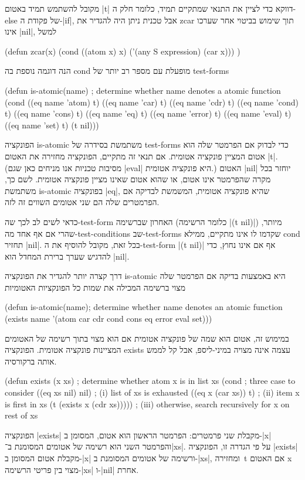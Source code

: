 מקובל להשתמש תמיד באטום \E|t| דווקא כדי לציין את התנאי שמתקיים תמיד, כלומר חלק
ה-else של פקודת ה-\E|if|, אבל טכנית ניתן היה להגדיר את zcar תוך שימוש בביטוי
אחר שערכו אינו \E|nil|, למשל
\begin{LISP}
(defun zcar(x)
  (cond ((atom x) x) ('(any S expression) (car x)))
)
\end{LISP}
הנה דוגמה נוספת בה cond מופעלת עם מספר רב יותר של test-forms
\begin{LISP}
(defun is-atomic(name) ; determine whether name denotes a atomic function
  (cond ((eq name 'atom) t)
        ((eq name 'car) t)
        ((eq name 'cdr) t)
        ((eq name 'cond) t)
        ((eq name 'cons) t)
        ((eq name 'eq) t)
        ((eq name 'error) t)
        ((eq name 'eval) t)
        ((eq name 'set) t)
        (t nil)))
\end{LISP}
הפונקציה is-atomic משתמשת בסידרה של test-forms כדי לבדוק אם הפרמטר שלה הוא
אטום המציין פונקציה אטומית. אם תנאי זה מתקיים, הפונקציה מחזירה את האטום
\E|t|. (מסיבות טכניות אנו מניחים כאן שגם \T|eval| היא פונקציה אטומית.)
האטום \E|nil| יוחזר בכל מקרה שהפרמטר אינו אטום, או שהוא אטום שאינו מציין
פונקציה אטומית. לשם כך, משתמשת
is-atomic בפונקציה \T|eq|, שהיא פונקציה אטומית, המשמשת לבדיקה אם הפרמטרים
שלה הם שני אטומים השווים זה לזה.

כדאי לשים לב לכך שה-test-form האחרון שברשימה (כלומר הרשימה \T|(t nil)|) מיותר,
שהרי אם אף אחד מה-test-conditions שב-test-forms שקדמו לו אינו מתקיים, ממילא
cond תחזיר \E|nil|. בכל זאת, מקובל להוסיף את ה-test-form \T|(t nil)| אף אם אינו
נחוץ, כדי להדגיש שערך ברירת המחדל הוא \E|nil|.

דרך קצרה יותר להגדיר את הפונקציה is-atomic היא באמצעות בדיקה אם הפרמטר
שלה מצוי ברשימה המכילה את שמות כל הפונקציות האטומיות
\begin{KERNEL}
(defun is-atomic(name); determine whether name denotes an atomic function
  (exists name '(atom car cdr cond cons eq error eval set)))
\end{KERNEL}
במימוש זה, אטום הוא שמה של פונקציה אטומית אם הוא מצוי בתוך רשימה של האטומים
המציינות פונקציה אטומית. הפונקציה exists עצמה אינה מצויה במיני-ליספ, אבל
קל לממש אותה ברקורסיה.
\begin{LISP}
(defun exists (x xs) ; determine whether atom x is in list xs
  (cond ; three case to consider
    ((eq xs nil) nil) ; (i) list of xs is exhausted
    ((eq x (car xs)) t) ; (ii) item x is first in xs
    (t (exists x (cdr xs))))) ; (iii) otherwise, search recursively for x on rest of xs
\end{LISP}
הפונקציה \T|exists| מקבלת שני פרמטרים: הפרמטר הראשון הוא אטום, המסומן ב-\T|x|
והפרמטר השני הוא רשימה של אטומים המסומנת ב־\T|xs|. על פי הגדרה זו, הפונקציה
\T|exists| מקבלת אטום המסומן ב-\T|x| ורשימה של אטומים המסומנת ב-\T|xs|,
ומחזירה~t אם האטום x מצוי בין פריטי הרשימה-\T|xs| ו-\T|nil| אחרת.

